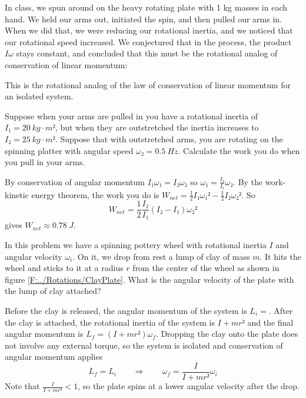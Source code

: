 In class, we spun around on the heavy rotating plate with 1 kg masses in each hand. We held our arms out, initiated the spin, and then pulled our arms in. When we did that, we were reducing our rotational inertia, and we noticed that our rotational speed increased. We conjectured that in the process, the product $Iω$ stays constant, and concluded that this must be the rotational analog of conservation of linear momentum: 
\begin{quote}
\end{quote}
This is the rotational analog of the law of conservation of linear momentum for an isolated system. 

 
\begin{example} 
Suppose when your arms are pulled in you have a rotational inertia of $I₁ = 20\ kg\cdot m²$, but when they are outstretched the inertia increases to $I₂ = 25\ kg\cdot m²$. Suppose that with outstretched arms, you are rotating on the spinning platter with angular speed $ω₂ = 0.5\ Hz$. Calculate the work you do when you pull in your arms. 

\begin{solution}
By conservation of angular momentum ${I₁}ω₁ ={I₂} ω₂$ so $ω₁ =\frac{I₂}{I₁} ω₂$. By the work-kinetic energy theorem, the work you do is $W_{net}= \frac12 I₁ ω₁² - \frac12 I₂ ω₂²$. So 
$$
W_{net} = \frac12 \frac{I₂}{I₁} \left( I₂-I₁ \right) ω₂²
$$
gives $W_{net} ≈ 0.78\ J$. 
\end{solution}
\end{example}


\begin{example}\label{Eg:ClayPlate}
In this problem we have a spinning pottery wheel with rotational inertia $I$ and angular velocity $ω_i$. On it, we drop from rest a lump of clay of mass $m$. It hits the wheel and sticks to it at a radius $r$ from the center of the wheel as shown in figure \ref{F:../Rotations/ClayPlate}. What is the angular velocity of the plate with the lump of clay attached? 
\begin{solution}
Before the clay is released, the angular momentum of the system is $L_i = $. After the clay is attached, the rotational inertia of the system is $I+mr²$ and the final angular momentum is $L_f = (I+mr²)ω_f$. Dropping the clay onto the plate does not involve any external torque, so the system is isolated and conservation of angular momentum applies 
$$
L_f = L_i
\quad \quad ⇒ \quad \quad 
ω_f = \frac I{I+mr²} ω_i
$$
Note that $\frac I{I+mr²} < 1$, so the plate spins at a lower angular velocity after the drop.
\end{solution}
\end{example}
 
